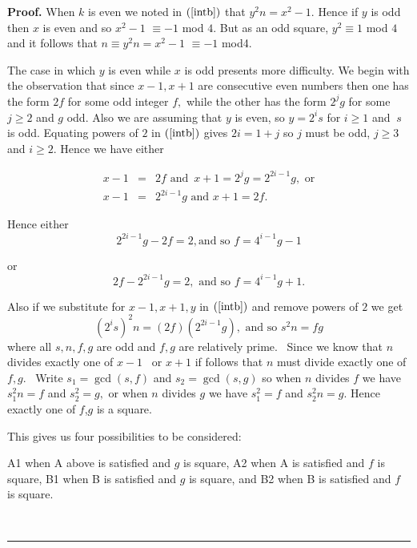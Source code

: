 \documentclass[12pt]{article}
\newenvironment{proof}[1][Proof]{\textbf{#1.} }{\ \rule{0.5em}{0.5em}}
\begin{document}
\begin{proof}
When $k$ is even we noted in $\left( \ref{intb}\right) $ that $%
y^{2}n=x^{2}-1.$ Hence if $y$ is odd then $x$ is even and so $x^{2}-1$ $%
\equiv -1$ mod $4.$ But as an odd square, $y^{2}\equiv 1$ mod $4$ and it
follows that $n\equiv y^{2}n=x^{2}-1$ $\equiv -1$ mod4.

The case in which $y$ is even while $x$ is odd presents more difficulty. We
begin with the observation that since $x-1,x+1$ are consecutive even numbers
then one has the form $2f$ for some odd integer $f,$ while the other has the
form $2^{j}g$ for some $j\geq 2$ and $g$ odd. Also we are assuming that $y$
is even, so $y=2^{i}s$ for $i\geq 1$ and $\ s$ is odd. Equating powers of $2$
in $\left( \ref{intb}\right) $ gives $2i=1+j$ so $j$ must be odd, $j\geq 3$
and $i\geq 2.$ Hence we have either

\begin{eqnarray*}
x-1 &=&2f\text{ and }\,x+1=2^{j}g=2^{2i-1}g,\text{ or} \\
x-1 &=&2^{2i-1}g\text{ and }x+1=2f.
\end{eqnarray*}

Hence either 
\begin{equation}
2^{2i-1}g-2f=2,\text{and so }f=4^{i-1}g-1  \tag{A}
\end{equation}

or 
\begin{equation}
2f-2^{2i-1}g=2,\text{ and so }f=4^{i-1}g+1.  \tag{B}
\end{equation}

Also if we substitute for $x-1,x+1,y$ in $\left( \ref{intb}\right) $ and
remove powers of $2$ we get 
\begin{equation*}
(2^{i}s)^{2}n=\left( 2f\right) \left( 2^{2i-1}g\right) ,\text{ and so }%
s^{2}n=fg
\end{equation*}%
where all $s,n,f,g$ are odd and $f,g$ are relatively prime. \ Since we know
that $n$ divides exactly one of $x-1$ \ or $x+1$ if follows that $n$ must
divide exactly one of $f,g$. \ Write $s_{1}=\gcd \left( s,f\right) $ and $%
s_{2}=\gcd \left( s,g\right) $ so when $n$ divides $f$ we have $s_{1}^{2}n=f$
and $s_{2}^{2}=g,$ or when $n$ divides $g$ we have $s_{1}^{2}=f$ and $%
s_{2}^{2}n=g.$ Hence exactly one of $f$,$g$ is a square.

This gives us four possibilities to be considered:

A1 when A above is satisfied and $g$ is square, A2 when A is satisfied and $%
f $ is square, B1 when B is satisfied and $g$ is square, and B2 when B is
satisfied and $f$ is square.


\end{proof}
\end{document}

